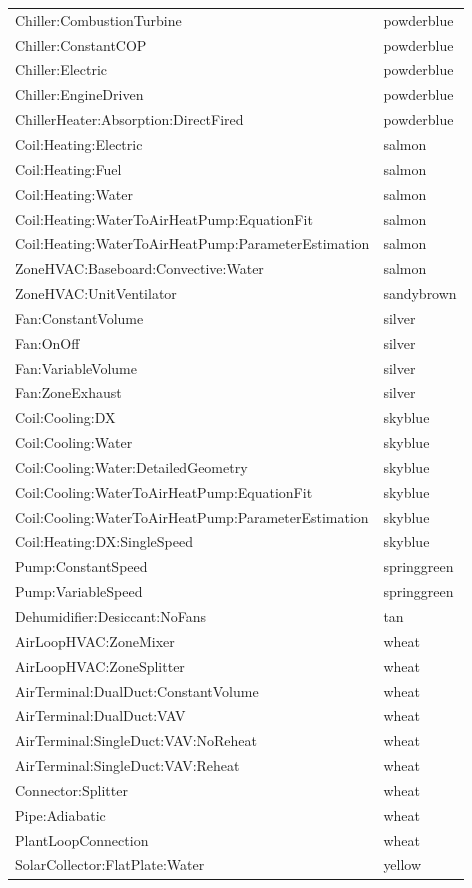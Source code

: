 \begin{longtable}[c]{@{}ll@{}}
Chiller:CombustionTurbine & powderblue \tabularnewline
Chiller:ConstantCOP & powderblue \tabularnewline
Chiller:Electric & powderblue \tabularnewline
Chiller:EngineDriven & powderblue \tabularnewline
ChillerHeater:Absorption:DirectFired & powderblue \tabularnewline
Coil:Heating:Electric & salmon \tabularnewline
Coil:Heating:Fuel & salmon \tabularnewline
Coil:Heating:Water & salmon \tabularnewline
Coil:Heating:WaterToAirHeatPump:EquationFit & salmon \tabularnewline
Coil:Heating:WaterToAirHeatPump:ParameterEstimation & salmon \tabularnewline
ZoneHVAC:Baseboard:Convective:Water & salmon \tabularnewline
ZoneHVAC:UnitVentilator & sandybrown \tabularnewline
Fan:ConstantVolume & silver \tabularnewline
Fan:OnOff & silver \tabularnewline
Fan:VariableVolume & silver \tabularnewline
Fan:ZoneExhaust & silver \tabularnewline
Coil:Cooling:DX & skyblue \tabularnewline
Coil:Cooling:Water & skyblue \tabularnewline
Coil:Cooling:Water:DetailedGeometry & skyblue \tabularnewline
Coil:Cooling:WaterToAirHeatPump:EquationFit & skyblue \tabularnewline
Coil:Cooling:WaterToAirHeatPump:ParameterEstimation & skyblue \tabularnewline
Coil:Heating:DX:SingleSpeed & skyblue \tabularnewline
Pump:ConstantSpeed & springgreen \tabularnewline
Pump:VariableSpeed & springgreen \tabularnewline
Dehumidifier:Desiccant:NoFans & tan \tabularnewline
AirLoopHVAC:ZoneMixer & wheat \tabularnewline
AirLoopHVAC:ZoneSplitter & wheat \tabularnewline
AirTerminal:DualDuct:ConstantVolume & wheat \tabularnewline
AirTerminal:DualDuct:VAV & wheat \tabularnewline
AirTerminal:SingleDuct:VAV:NoReheat & wheat \tabularnewline
AirTerminal:SingleDuct:VAV:Reheat & wheat \tabularnewline
Connector:Splitter & wheat \tabularnewline
Pipe:Adiabatic & wheat \tabularnewline
PlantLoopConnection & wheat \tabularnewline
SolarCollector:FlatPlate:Water & yellow \tabularnewline
\bottomrule
\end{longtable}
